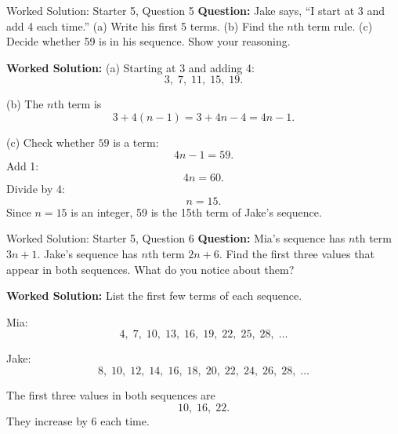 \documentclass{beamer}
\begin{document}
\begin{frame}{Worked Solution: Starter 5, Question 5}
\textbf{Question:} Jake says, ``I start at 3 and add 4 each time.'' (a) Write his first 5 terms. (b) Find the $n$th term rule. (c) Decide whether 59 is in his sequence. Show your reasoning.

\textbf{Worked Solution:}  
(a) Starting at 3 and adding 4:
\[
3,\;7,\;11,\;15,\;19.
\]

(b) The $n$th term is
\[
3+4(n-1)=3+4n-4=4n-1.
\]

(c) Check whether $59$ is a term:
\[
4n-1=59.
\]
Add 1:
\[
4n=60.
\]
Divide by 4:
\[
n=15.
\]
Since $n=15$ is an integer, 59 is the 15th term of Jake's sequence.
\end{frame}

\begin{frame}{Worked Solution: Starter 5, Question 6}
\textbf{Question:} Mia's sequence has $n$th term $3n+1$. Jake's sequence has $n$th term $2n+6$. Find the first three values that appear in both sequences. What do you notice about them?

\textbf{Worked Solution:} List the first few terms of each sequence.

Mia:
\[
4,\;7,\;10,\;13,\;16,\;19,\;22,\;25,\;28,\;\ldots
\]

Jake:
\[
8,\;10,\;12,\;14,\;16,\;18,\;20,\;22,\;24,\;26,\;28,\;\ldots
\]

The first three values in both sequences are
\[
10,\;16,\;22.
\]
They increase by 6 each time.
\end{frame}
\end{document}
